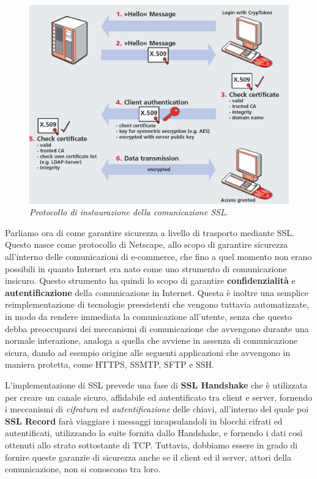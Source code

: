 \begin{figure}[!t]
\centering
\includegraphics[scale=0.4]{images/ssl2.png}
\caption{\textit{Protocollo di instaurazione della comunicazione SSL}.}
\label{img:ssl2}
\end{figure}

Parliamo ora di come garantire sicurezza a livello di trasporto mediante SSL.
Questo nasce come protocollo di Netscape, allo scopo di garantire sicurezza
all'interno delle comunicazioni di e-commerce, che fino a quel momento non 
erano possibili in quanto Internet era nato come uno strumento di comunicazione
insicuro. Questo strumento ha quindi lo scopo di garantire \textbf{confidenzialità} 
e \textbf{autentificazione} della comunicazione in Internet. Questa è inoltre una
semplice reimplementazione di tecnologie preesistenti che vengono tuttavia
automatizzate, in modo da rendere immediata la comunicazione all'utente, senza
che questo debba preoccuparsi dei meccanismi di comunicazione che avvengono
durante una normale interazione, analoga a quella che avviene in assenza di
comunicazione sicura, dando ad esempio origine alle seguenti applicazioni che
avvengono in maniera protetta, come HTTPS, SSMTP, SFTP e SSH.


L'implementazione di SSL prevede una fase di \textbf{SSL Handshake} che è 
utilizzata per creare un canale sicuro, affidabile ed autentificato tra 
client e server, fornendo
i meccanismi di \textit{cifratura} ed \textit{autentificazione} delle chiavi,
all'interno del quale poi \textbf{SSL Record} farà viaggiare i messaggi 
incapsulandoli in blocchi cifrati ed autentificati, utilizzando la suite
fornita dallo Handshake, e fornendo i dati così ottenuti allo strato 
sottostante di TCP. Tuttavia, dobbiamo essere in grado di fornire queste garanzie
di sicurezza anche se il client ed il server, attori della comunicazione, non 
si conoscono tra loro.

